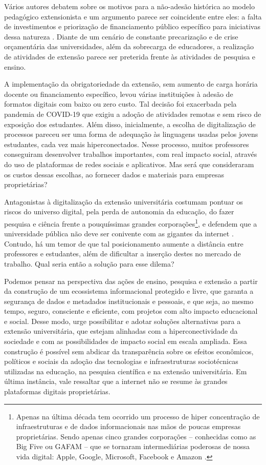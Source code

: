 \documentclass[portuguese]{textolivre}
\begin{document}
Vários autores debatem sobre os motivos para a não-adesão histórica ao
modelo pedagógico extensionista e um argumento parece ser coincidente
entre eles: a falta de investimentos e priorização de financiamento
público específico para iniciativas dessa natureza
\cite{Gomez2019, Oliveira2015, Paula2013}. Diante de um cenário de
constante precarização e de crise orçamentária das universidades, além
da sobrecarga de educadores, a realização de atividades de extensão
parece ser preterida frente às atividades de pesquisa e ensino.

A implementação da obrigatoriedade da extensão, sem aumento de carga
horária docente ou financiamento específico, levou várias instituições à
adesão de formatos digitais com baixo ou zero custo. Tal decisão foi
exacerbada pela pandemia de COVID-19 que exigiu a adoção de atividades
remotas e sem risco de exposição dos estudantes. Além disso,
inicialmente, a escolha de digitalização de processos pareceu ser uma
forma de adequação às linguagens usadas pelos jovens estudantes, cada
vez mais hiperconectados. Nesse processo, muitos professores conseguiram
desenvolver trabalhos importantes, com real impacto social, através do
uso de plataformas de redes sociais e aplicativos. Mas será que
consideraram os custos dessas escolhas, ao fornecer dados e materiais
para empresas proprietárias?

Antagonistas à digitalização da extensão universitária costumam pontuar
os riscos do universo digital, pela perda de autonomia da educação, do
fazer pesquisa e ciência frente a pouquíssimas grandes
corporações\footnote{Apenas na última década tem
  ocorrido um processo de hiper concentração de infraestruturas e de
  dados informacionais nas mãos de poucas empresas proprietárias. Sendo
  apenas cinco grandes corporações -- conhecidas como as Big Five ou
  GAFAM -- que se tornaram intermediárias poderosas de nossa vida
  digital: Apple, Google, Microsoft, Facebook e Amazon
  \cite{Dijck2018}.}, e defendem que a universidade pública não deve
ser conivente com as gigantes da internet \cite{Parra2018, Zuboff2015}.
Contudo, há um temor de que tal posicionamento aumente a distância entre
professores e estudantes, além de dificultar a inserção destes no
mercado de trabalho. Qual seria então a solução para esse dilema?

Podemos pensar na perspectiva das ações de ensino, pesquisa e extensão a
partir da construção de um ecossistema informacional protegido e livre,
que garanta a segurança de dados e metadados institucionais e pessoais,
e que seja, ao mesmo tempo, seguro, consciente e eficiente, com projetos
com alto impacto educacional e social. Desse modo, urge possibilitar e
adotar soluções alternativas para a extensão universitária, que estejam
alinhadas com a hiperconectividade da sociedade e com as possibilidades
de impacto social em escala ampliada. Essa construção é possível sem
abdicar da transparência sobre os efeitos econômicos, políticos e
sociais da adoção das tecnologias e infraestruturas sociotécnicas
utilizadas na educação, na pesquisa científica e na extensão
universitária. Em última instância, vale ressaltar que a internet não se
resume às grandes plataformas digitais proprietárias.
\end{document}
